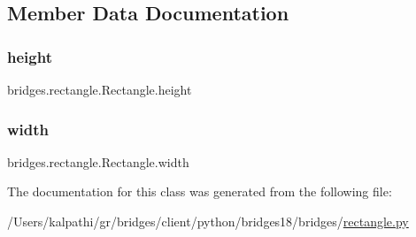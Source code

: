 \subsection{Member Data Documentation}
\mbox{\label{classbridges_1_1rectangle_1_1_rectangle_a3b7a2448881d5eea95e86aac8dfae467}} 
\subsubsection{\texorpdfstring{height}{height}}
{\footnotesize\ttfamily bridges.\+rectangle.\+Rectangle.\+height}

\mbox{\label{classbridges_1_1rectangle_1_1_rectangle_ac70360e861fb0dfab5fae8525ffc86ba}} 
\subsubsection{\texorpdfstring{width}{width}}
{\footnotesize\ttfamily bridges.\+rectangle.\+Rectangle.\+width}



The documentation for this class was generated from the following file\+:\begin{DoxyCompactItemize}
\item 
/\+Users/kalpathi/gr/bridges/client/python/bridges18/bridges/\mbox{\hyperlink{rectangle_8py}{rectangle.\+py}}\end{DoxyCompactItemize}
